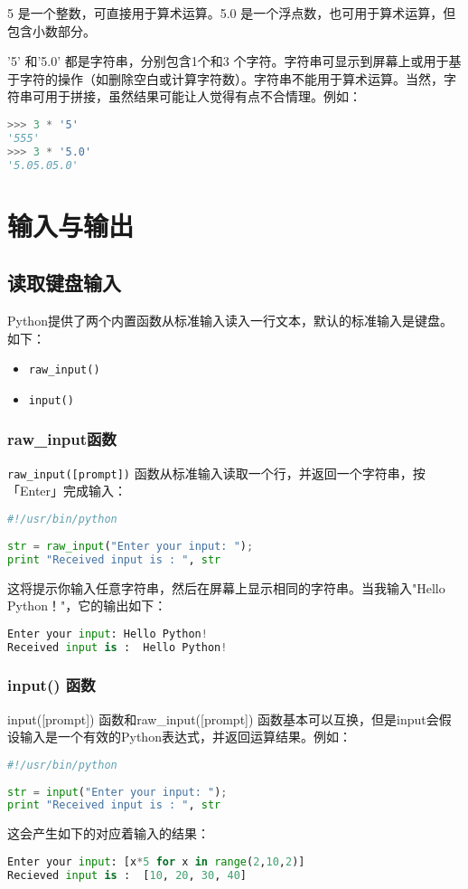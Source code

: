 5 是一个整数，可直接用于算术运算。5.0 是一个浮点数，也可用于算术运算，但包含小数部分。

'5' 和'5.0' 都是字符串，分别包含1个和3 个字符。字符串可显示到屏幕上或用于基于字符的操作（如删除空白或计算字符数）。字符串不能用于算术运算。当然，字符串可用于拼接，虽然结果可能让人觉得有点不合情理。例如：
\begin{lstlisting}[language=Python]
>>> 3 * '5'
'555'
>>> 3 * '5.0'
'5.05.05.0'
\end{lstlisting}



\section{输入与输出}
\subsection{读取键盘输入}
Python提供了两个内置函数从标准输入读入一行文本，默认的标准输入是键盘。如下：
\begin{itemize}
\item \verb|raw_input()|
\item \verb|input()|
\end{itemize}


\subsubsection{raw\_input函数}
\verb|raw_input([prompt])| 函数从标准输入读取一个行，并返回一个字符串，按「Enter」完成输入：
\begin{lstlisting}[language=Python]
#!/usr/bin/python
 
str = raw_input("Enter your input: ");
print "Received input is : ", str
\end{lstlisting}
这将提示你输入任意字符串，然后在屏幕上显示相同的字符串。当我输入"Hello Python！"，它的输出如下：
\begin{lstlisting}[language=Python]
Enter your input: Hello Python!
Received input is :  Hello Python!
\end{lstlisting}


\subsubsection{input() 函数}
input([prompt]) 函数和raw\_input([prompt]) 函数基本可以互换，但是input会假设输入是一个有效的Python表达式，并返回运算结果。例如：
\begin{lstlisting}[language=Python]
#!/usr/bin/python
 
str = input("Enter your input: ");
print "Received input is : ", str
\end{lstlisting}
这会产生如下的对应着输入的结果：
\begin{lstlisting}[language=Python]
Enter your input: [x*5 for x in range(2,10,2)]
Recieved input is :  [10, 20, 30, 40]
\end{lstlisting}


